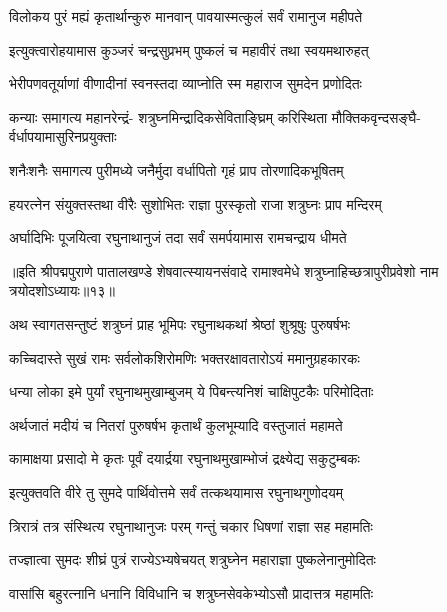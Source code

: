 \twolineshloka
{विलोकय पुरं मह्यं कृतार्थान्कुरु मानवान्}
{पावयास्मत्कुलं सर्वं रामानुज महीपते}%

\twolineshloka
{इत्युक्त्वारोहयामास कुञ्जरं चन्द्रसुप्रभम्}
{पुष्कलं च महावीरं तथा स्वयमथारुहत्}%

\twolineshloka
{भेरीपणवतूर्याणां वीणादीनां स्वनस्तदा}
{व्याप्नोति स्म महाराज सुमदेन प्रणोदितः}%

\fourlineindentedshloka
{कन्याः समागत्य महानरेन्द्रं-}
{शत्रुघ्नमिन्द्रादिकसेविताङ्घ्रिम्}
{करिस्थिता मौक्तिकवृन्दसङ्घै-}
{र्वर्धापयामासुरिनप्रयुक्ताः}%

\twolineshloka
{शनैःशनैः समागत्य पुरीमध्ये जनैर्मुदा}
{वर्धापितो गृहं प्राप तोरणादिकभूषितम्}%

\twolineshloka
{हयरत्नेन संयुक्तस्तथा वीरैः सुशोभितः}
{राज्ञा पुरस्कृतो राजा शत्रुघ्नः प्राप मन्दिरम्}%

\twolineshloka
{अर्घादिभिः पूजयित्वा रघुनाथानुजं तदा}
{सर्वं समर्पयामास रामचन्द्राय धीमते}%

{॥इति श्रीपद्मपुराणे पातालखण्डे शेषवात्स्यायनसंवादे रामाश्वमेधे शत्रुघ्नाहिच्छत्रापुरीप्रवेशो नाम त्रयोदशोऽध्यायः॥१३॥}



\twolineshloka
{अथ स्वागतसन्तुष्टं शत्रुघ्नं प्राह भूमिपः}
{रघुनाथकथां श्रेष्ठां शुश्रूषुः पुरुषर्षभः}%


\twolineshloka
{कच्चिदास्ते सुखं रामः सर्वलोकशिरोमणिः}
{भक्तरक्षावतारोऽयं ममानुग्रहकारकः}%

\twolineshloka
{धन्या लोका इमे पुर्यां रघुनाथमुखाम्बुजम्}
{ये पिबन्त्यनिशं चाक्षिपुटकैः परिमोदिताः}%

\twolineshloka
{अर्थजातं मदीयं च नितरां पुरुषर्षभ}
{कृतार्थं कुलभूम्यादि वस्तुजातं महामते}%

\twolineshloka
{कामाक्षया प्रसादो मे कृतः पूर्वं दयार्द्रया}
{रघुनाथमुखाम्भोजं द्रक्ष्येद्य सकुटुम्बकः}%

\twolineshloka
{इत्युक्तवति वीरे तु सुमदे पार्थिवोत्तमे}
{सर्वं तत्कथयामास रघुनाथगुणोदयम्}%

\twolineshloka
{त्रिरात्रं तत्र संस्थित्य रघुनाथानुजः परम्}
{गन्तुं चकार धिषणां राज्ञा सह महामतिः}%

\twolineshloka
{तज्ज्ञात्वा सुमदः शीघ्रं पुत्रं राज्येऽभ्यषेचयत्}
{शत्रुघ्नेन महाराज्ञा पुष्कलेनानुमोदितः}%

\twolineshloka
{वासांसि बहुरत्नानि धनानि विविधानि च}
{शत्रुघ्नसेवकेभ्योऽसौ प्रादात्तत्र महामतिः}%

